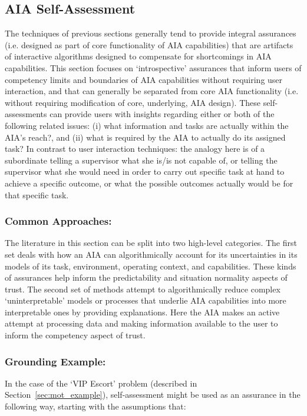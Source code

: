 \subsection{AIA Self-Assessment} \label{sec:aia_self_assessment}

The techniques of previous sections generally tend to provide integral assurances (i.e. designed as part of core functionality of AIA capabilities) that are artifacts of interactive algorithms designed to compensate for shortcomings in AIA capabilities. This section focuses on `introspective' assurances that inform users of competency limits and boundaries of AIA capabilities without requiring user interaction, and that can generally be separated from core AIA functionality (i.e. without requiring modification of core, underlying, AIA design).  These self-assessments can provide users with insights regarding either or both of the following related issues: (i) what information and tasks are actually within the AIA's reach?, and (ii) what is required by the AIA to actually do its assigned task? 
In contrast to user interaction techniques: the analogy here is of a subordinate telling a supervisor what she is/is not capable of, or telling the supervisor what she would need in order to carry out specific task at hand to achieve a specific outcome, or what the possible outcomes actually would be for that specific task. 

\subsubsection{Common Approaches:}
The literature in this section can be split into two high-level categories. 
The first set deals with how an AIA can algorithmically account for its uncertainties in its models of its task, environment, operating context, and capabilities. 
These kinds of assurances help inform the predictability and situation normality aspects of trust. 
The second set of methods attempt to algorithmically reduce complex `uninterpretable' models or processes that underlie AIA capabilities into more interpretable ones by providing explanations. 
Here the AIA makes an active attempt at processing data and making information available to the user to inform the competency aspect of trust. 




\subsubsection{Grounding Example:}
In the case of the `VIP Escort' problem (described in Section~\ref{sec:mot_example}), self-assessment might be used as an assurance in the following way, starting with the assumptions that:

